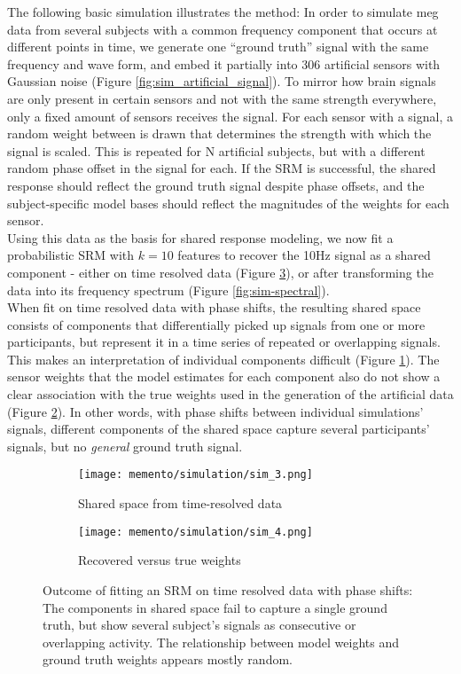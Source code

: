 The following basic simulation illustrates the method:
In order to simulate \gls{meg} data from several subjects with a common frequency component that occurs at different points in time, we generate one ``ground truth'' signal with the same frequency and wave form, and embed it partially into 306 artificial sensors with Gaussian noise (Figure \ref{fig:sim_artificial_signal}).
To mirror how brain signals are only present in certain sensors and not with the same strength everywhere, only a fixed amount of sensors receives the signal.
For each sensor with a signal, a random weight between is drawn that determines the strength with which the signal is scaled.
This is repeated for N artificial subjects, but with a different random phase offset in the signal for each.
If the \gls{SRM} is successful, the shared response should reflect the ground truth signal despite phase offsets, and the subject-specific model bases should reflect the magnitudes of the weights for each sensor.\\
Using this data as the basis for shared response modeling, we now fit a probabilistic \gls{SRM} with $k=10$ features to recover the 10Hz signal as a shared component - either on time resolved data (Figure \ref{fig:sim-timeresolved}), or after transforming the data into its frequency spectrum (Figure \ref{fig:sim-spectral}).\\
When fit on time resolved data with phase shifts, the resulting shared space consists of components that differentially picked up signals from one or more participants, but represent it in a time series of repeated or overlapping signals.
This makes an interpretation of individual components difficult (Figure \ref{fig:sim-timeresolved-shared}).
The sensor weights that the model estimates for each component also do not show a clear association with the true weights used in the generation of the artificial data (Figure \ref{fig:sim-timeresolved-weights}).
In other words, with phase shifts between individual simulations' signals, different components of the shared space capture several participants' signals, but no \textit{general} ground truth signal.

\begin{figure}
	\begin{subfigure}{.49\textwidth}
		\texttt{[image: memento/simulation/sim\_3.png]}
		\caption{Shared space from time-resolved data}
		\label{fig:sim-timeresolved-shared}
	\end{subfigure}
	\begin{subfigure}{0.49\textwidth}
		\texttt{[image: memento/simulation/sim\_4.png]}
		\caption{Recovered versus true weights}
		\label{fig:sim-timeresolved-weights}
	\end{subfigure}
	\caption{Outcome of fitting an \gls{SRM} on time resolved data with phase shifts: The components in shared space fail to capture a single ground truth, but show several subject's signals as consecutive or overlapping activity. The relationship between model weights and ground truth weights appears mostly random.}
	\label{fig:sim-timeresolved}
\end{figure}


